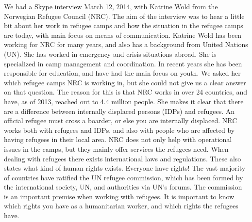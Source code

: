 We had a Skype interview March 12, 2014, with Katrine Wold from the Norwegian Refugee Council (NRC). The aim of the interview was to hear a little bit about her work in refugee camps and how the situation in the refugee camps are today, with main focus on means of communication.
Katrine Wold has been working for NRC for many years, and also has a background from United Nations (UN). She has worked in emergency and crisis situations abroad. She is specialized in camp management and coordination. In recent years she has been responsible for education, and have had the main focus on youth. We asked her which refugee camps NRC is working in, but she could not give us a clear answer on that question. The reason for this is that NRC works in over 24 countries, and have, as of 2013, reached out to 4.4 million people. She makes it clear that there are a difference between internally displaced persons (IDPs) and refugees. An official refugee must cross a boarder, or else you are internally displaced. NRC works both with refugees and IDPs, and also with people who are affected by having refugees in their local area. NRC does not only help with operational issues in the camps, but they mainly offer services the refugees need. When dealing with refugees there exists international laws and regulations. These also states what kind of human rights exists. Everyone have rights! The vast majority of countries have ratified the UN refugee commission, which has been formed by the international society, UN, and authorities via UN's forums. The commission is an important premise when working with refugees. It is important to know which rights you have as a humanitarian worker, and which rights the refugees have. 

